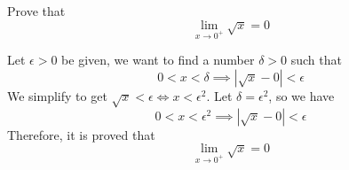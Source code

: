 \begin{problem}
    Prove that \[\lim_{x\to 0^+}\sqrt{x}=0\]
\end{problem}
\begin{solution}
    Let \(\epsilon>0\) be given, we want to find a number \(\delta>0\) such
    that \[0<x<\delta\implies|\sqrt{x}-0|<\epsilon\]
    We simplify to get \(\sqrt{x}<\epsilon\iff x<\epsilon^2\).
    Let \(\delta=\epsilon^2\), so we have
    \[0<x<\epsilon^2\implies|\sqrt{x}-0|<\epsilon\]
    Therefore, it is proved that \[\lim_{x\to 0^+}\sqrt{x}=0\]
\end{solution}
